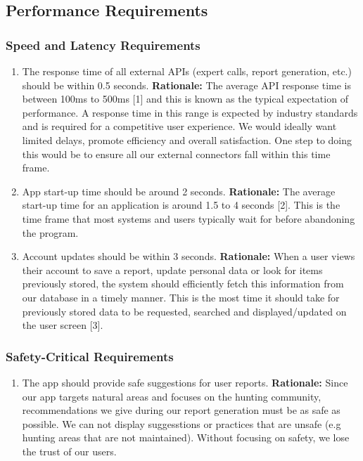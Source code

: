 \documentclass[]{article}
\begin{document}
\subsection{Performance Requirements}
\label{sub:performance_requirements}

\subsubsection{Speed and Latency Requirements}
\label{ssub:speed_and_latency_requirements}
\begin{enumerate}[{PR-SL}1. ]
	\item The response time of all external APIs (expert calls, report generation, etc.) should be within 0.5 seconds.
	\newline  \textbf{Rationale:} The average API response time is between 100ms to 500ms [1] and this is known as the typical expectation of performance. A response time in this range is expected by industry standards and is required for a competitive user experience. We would ideally want limited delays, promote efficiency and overall satisfaction. One step to doing this would be to ensure all our external connectors fall within this time frame. 
	\item App start-up time should be around 2 seconds.
	\newline  \textbf{Rationale:} The average start-up time for an application is around 1.5 to 4 seconds [2]. This is the time frame that most systems and users typically wait for before abandoning the program. 
	\item Account updates should be within 3 seconds.
	\newline \textbf{Rationale:} When a user views their account to save a report, update personal data or look for items previously stored, the system should efficiently fetch this information from our database in a timely manner. This is the most time it should take for previously stored data to be requested, searched and displayed/updated on the user screen [3].
\end{enumerate}

\subsubsection{Safety-Critical Requirements}
\label{ssub:safety_critical_requirements}
\begin{enumerate}[{PR-SC}1. ]
	\item The app should provide safe suggestions for user reports.
	\newline \textbf{Rationale:} Since our app targets natural areas and focuses on the hunting community, recommendations we give during our report generation must be as safe as possible. We can not display suggesstions or practices that are unsafe (e.g hunting areas that are not maintained). Without focusing on safety, we lose the trust of our users.
\end{enumerate}
\end{document}

